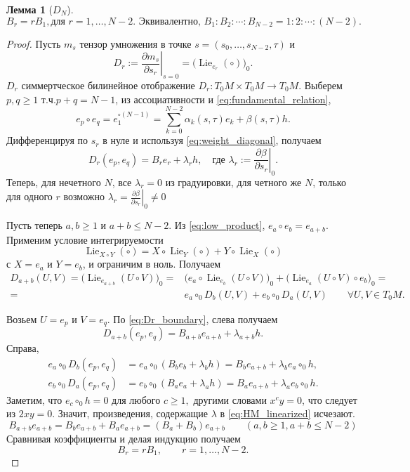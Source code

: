 \documentclass[a4paper, 10pt]{article}
\theoremstyle{plain}
\newtheorem{lem}{Лемма}
\newcommand\Lie{\operatorname{Lie}}
\begin{document}
	\begin{lem}[$D_N$]
		\[B_r=rB_1,\text{для } r=1,\ldots,N-2.
		\text{ Эквивалентно, } B_1:B_2:\cdots:B_{N-2}=1:2:\cdots:(N-2).\]
	\end{lem}
	\begin{proof}
		Пусть $m_s$ тензор умножения в точке $s=(s_0,\ldots,s_{N-2},\tau)$ и
		\[D_r:=\left.\frac{\partial m_s}{\partial s_r}\right|_{s=0}=\bigl(\Lie_{e_r}(\circ)\bigr)_0.\]
		$D_r$ симмертческое билинейное отображение \(D_r:T_0M\times T_0M\longrightarrow T_0M.\)
		Выберем $p,q\ge 1$ т.ч.\(p+q=N-1\), из ассоциативности и \eqref{eq:fundamental_relation},
		\[e_p\circ e_q=e_1^{\circ(N-1)}
		=
		\sum_{k=0}^{N-2}\alpha_k(s,\tau)e_k
		+\beta(s,\tau)h.\]
		Дифференцируя по $s_r$ в нуле и используя  \eqref{eq:weight_diagonal}, получаем
		\begin{equation}
			D_r(e_p,e_q)=B_r e_r+\lambda_r h,
			\label{eq:Dr_boundary}
		\quad \text{где }\lambda_r:=
		\left.\frac{\partial\beta}{\partial s_r}\right|_0.
	\end{equation}
	Теперь, для нечетного \(N\), все \(\lambda_r = 0\) из градуировки,  для четного же \(N\), только для одного \(r\) возможно $\lambda_r = \left.\frac{\partial\beta}{\partial s_r}\right|_0\ne0$ \par
		Пусть теперь $a,b\ge1$ и $a+b\le N-2.$ Из \eqref{eq:low_product},
		\(e_a\circ e_b=e_{a+b}.\)
		Применим условие интегрируемости
		\[\Lie_{X\circ Y}(\circ)
		=
		X\circ\Lie_Y(\circ)+Y\circ\Lie_X(\circ)\]
		с $X=e_a$ и $Y=e_b$, и ограничим в ноль. Получаем
		\begin{equation}
			\begin{aligned}
			D_{a+b}(U,V) = \bigl(\Lie_{e_{a+b}}(U\circ V)\bigr)_0
			=&
			\bigl(e_a \circ \Lie_{e_b}(U\circ V)\bigr)_0 + \bigl(\Lie_{e_a}(U\circ V) \circ e_b\bigr)_0
			=\\=&
			e_a\circ_0D_b(U,V)
			+e_b\circ_0D_a(U,V)
			\label{eq:HM_linearized} 
			\qquad \forall U,V\in T_0M.
		\end{aligned}
		\end{equation}
		
		Возьем $U=e_p$ и $V=e_q$. По \eqref{eq:Dr_boundary}, слева получаем
		\[
		D_{a+b}(e_p,e_q)
		=B_{a+b}e_{a+b}+\lambda_{a+b}h.
		\]
		Справа,
		\begin{align*}
			e_a\circ_0D_b(e_p,e_q)
			&=e_a\circ_0(B_b e_b+\lambda_bh) = B_b e_{a+b} + \lambda_b e_a \circ_0 h,\\
			e_b\circ_0D_a(e_p,e_q)
			&=e_b\circ_0(B_a e_a+\lambda_ah) = B_a e_{a+b} + \lambda_a e_b \circ_0 h.
		\end{align*}
		Заметим, что 
		\(e_c\circ_0 h=0 \text{ для любого }c\ge1,\)
		другими словами $x^cy=0$, что следует из $2xy=0$.
		Значит, произведения, содержащие \(\lambda\) в \eqref{eq:HM_linearized} исчезают. 
		\begin{equation}
		B_{a+b} e_{a+b} = B_be_{a+b}+B_ae_{a+b} = (B_a + B_b)e_{a+b}\qquad (a,b \ge 1, a+b \le N-2) \label{eq:linear_coef}
		\end{equation}
		Сравнивая коэффициенты и делая индукцию получаем
		\[
		B_r=rB_1,\qquad r=1,\ldots,N-2.
		\]
	\end{proof}
\end{document}
